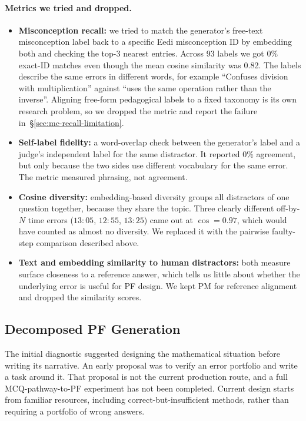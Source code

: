 \paragraph{Metrics we tried and dropped.}
\begin{itemize}
    \item \textbf{Misconception recall:} we tried to match the generator's free-text misconception label back to a specific Eedi misconception ID by embedding both and checking the top-3 nearest entries. Across 93 labels we got 0\% exact-ID matches even though the mean cosine similarity was 0.82. The labels describe the same errors in different words, for example ``Confuses division with multiplication'' against ``uses the same operation rather than the inverse''. Aligning free-form pedagogical labels to a fixed taxonomy is its own research problem, so we dropped the metric and report the failure in~\S\ref{sec:mc-recall-limitation}.
    \item \textbf{Self-label fidelity:} a word-overlap check between the generator's label and a judge's independent label for the same distractor. It reported 0\% agreement, but only because the two sides use different vocabulary for the same error. The metric measured phrasing, not agreement.
    \item \textbf{Cosine diversity:} embedding-based diversity groups all distractors of one question together, because they share the topic. Three clearly different off-by-$N$ time errors ($13{:}05$, $12{:}55$, $13{:}25$) came out at $\cos = 0.97$, which would have counted as almost no diversity. We replaced it with the pairwise faulty-step comparison described above.
    \item \textbf{Text and embedding similarity to human distractors:} both measure surface closeness to a reference answer, which tells us little about whether the underlying error is useful for PF design. We kept PM for reference alignment and dropped the similarity scores.
\end{itemize}

\subsection{Decomposed PF Generation}

The initial diagnostic suggested designing the mathematical situation before writing its narrative. An early proposal was to verify an error portfolio and write a task around it. That proposal is not the current production route, and a full MCQ-pathway-to-PF experiment has not been completed. Current design starts from familiar resources, including correct-but-insufficient methods, rather than requiring a portfolio of wrong answers.

